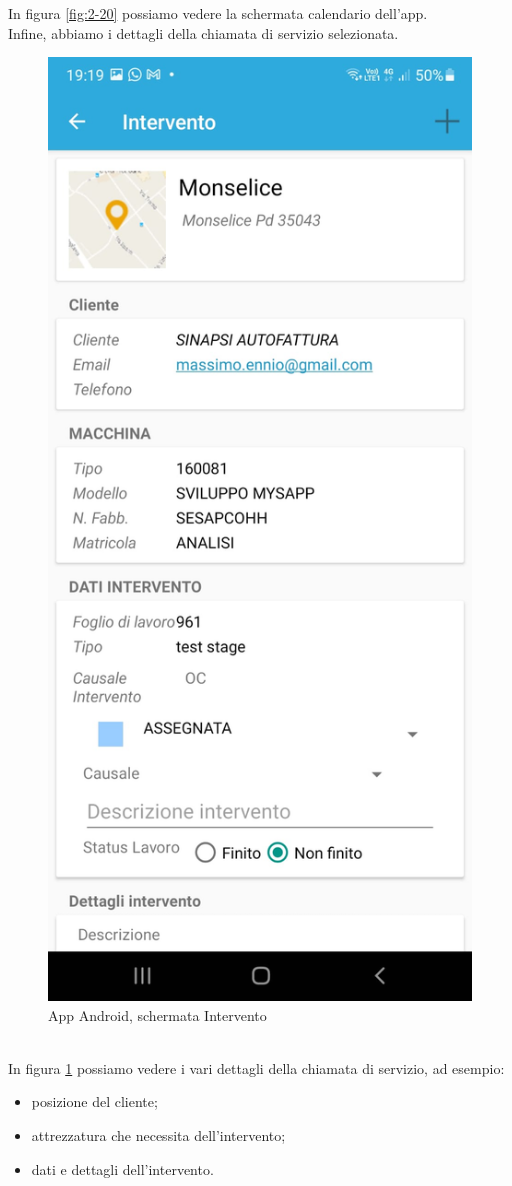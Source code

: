 In figura \ref{fig:2-20} possiamo vedere la schermata calendario dell'app.\\
\newpage
Infine, abbiamo i dettagli della chiamata di servizio selezionata.\\
\begin{figure}[!h] 
	\centering 
	\includegraphics[scale = 0.2]{immagini/app Android/intervento-android.jpeg} 
	\caption {App Android, schermata Intervento}
	\label{fig:2-21}
\end{figure}
\\In figura \ref{fig:2-21} possiamo vedere i vari dettagli della chiamata di servizio, ad esempio:
\begin{itemize}
	\item posizione del cliente;
	\item attrezzatura che necessita dell'intervento;
	\item dati e dettagli dell'intervento.
\end{itemize}
\newpage
